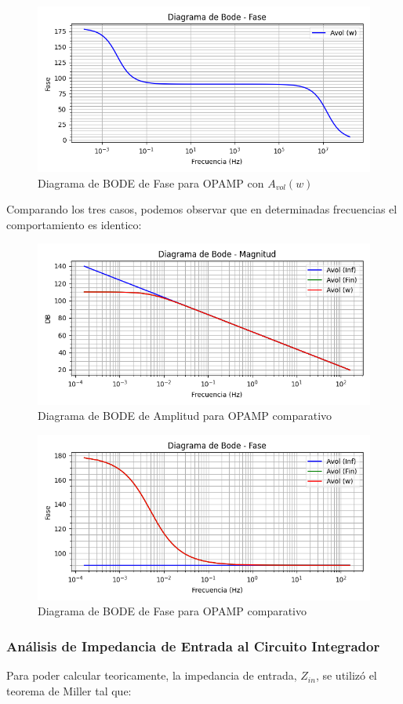 \begin{figure}[H]
    \centering 
    \includegraphics [scale=1] {../Ejercicio3-CircuitoIntegradoresyDerivadores/Imagenes/diagrama-bode-noideal-fase.png} 
    \caption{Diagrama de BODE de Fase para OPAMP con $A_{vol}(w)$ }
    \label{fig:emptyPlotTool}
\end{figure}

Comparando los tres casos, podemos observar que en determinadas frecuencias el comportamiento es identico:

\begin{figure}[H]
    \centering 
    \includegraphics [scale=1] {../Ejercicio3-CircuitoIntegradoresyDerivadores/Imagenes/comparativo-magnitud.png} 
    \caption{Diagrama de BODE de Amplitud para OPAMP comparativo }
    \label{fig:emptyPlotTool}
\end{figure}

\begin{figure}[H]
    \centering 
    \includegraphics [scale=1] {../Ejercicio3-CircuitoIntegradoresyDerivadores/Imagenes/comparativo-fase.png} 
    \caption{Diagrama de BODE de Fase para OPAMP comparativo }
    \label{fig:emptyPlotTool}
\end{figure}

\subsubsection{Análisis de Impedancia de Entrada al Circuito Integrador}

Para poder calcular teoricamente, la impedancia de entrada, $Z_{in}$, se utilizó el teorema de Miller tal que:

